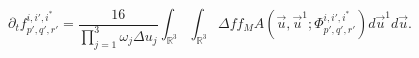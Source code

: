 %
\begin{equation*}
\partial_t f_{p',q',r'}^{i,i',i^*} = \frac{16}{\prod_{j=1}^3 \omega_j \Delta u_j} \int_{\mathbb{R}^3} \int_{\mathbb{R}^3} \Delta f f_M A(\vec{u},\vec{u}^1;\Phi^{i,i',i^*}_{p',q',r'}) d\vec{u}^1 d\vec{u}.
\end{equation*}
%
%
